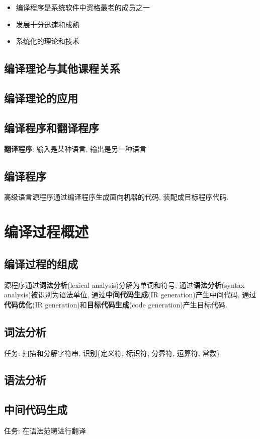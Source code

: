         \begin{itemize}
            \item 编译程序是系统软件中资格最老的成员之一
            \item 发展十分迅速和成熟
            \item 系统化的理论和技术
        \end{itemize}


    \subsection{编译理论与其他课程关系}

    \subsection{编译理论的应用}

    \subsection{编译程序和翻译程序}

        \textbf{翻译程序}: 输入是某种语言, 输出是另一种语言

    \subsection{编译程序}

        高级语言源程序通过编译程序生成面向机器的代码, 装配成目标程序代码.

\section{编译过程概述}

    \subsection{编译过程的组成}

        源程序通过\textbf{词法分析}(lexical analysis)分解为单词和符号, 通过\textbf{语法分析}(syntax analysis)被识别为语法单位, 通过\textbf{中间代码生成}(IR generation)产生中间代码, 通过\textbf{代码优化}(IR generation)和\textbf{目标代码生成}(code generation)产生目标代码.

    \subsection{词法分析}

        任务: 扫描和分解字符串, 识别\{定义符, 标识符, 分界符, 运算符, 常数\}

    \subsection{语法分析}

    \subsection{中间代码生成}

        任务: 在语法范畴进行翻译
